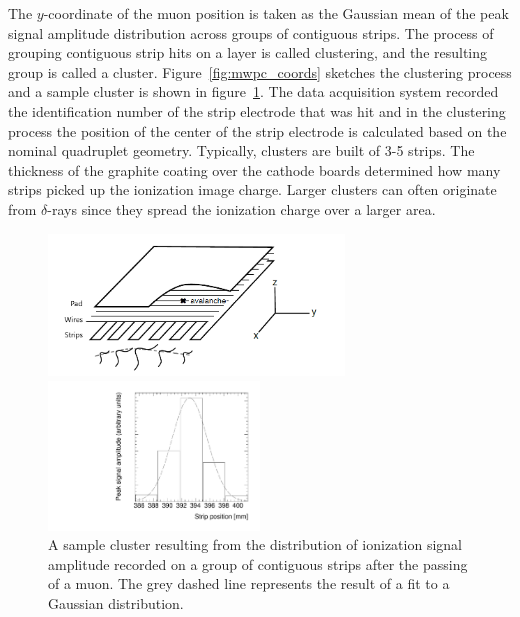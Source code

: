The $y$-coordinate of the muon position is taken as the Gaussian mean of the peak signal amplitude distribution across groups of contiguous strips. The process of grouping contiguous strip hits on a layer is called clustering, and the resulting group is called a cluster. Figure~\ref{fig:mwpc_coords} sketches the clustering process and a sample cluster is shown in figure~\ref{fig:sample_cluster}. The data acquisition system recorded the identification number of the strip electrode that was hit and in the clustering process the position of the center of the strip electrode is calculated based on the nominal quadruplet geometry. Typically, clusters are built of 3-5 strips. The thickness of the graphite coating over the cathode boards determined how many strips picked up the ionization image charge. Larger clusters can often originate from $\delta$-rays since they spread the ionization charge over a larger area.

\begin{figure}
    \centering
    \includegraphics[width = 0.7\textwidth]{figures/mwpc_lefebvre_thesis_gatti.png}
    \caption{Schematic diagram representing the three types of electrodes in a sTGC detector. The position of the ionization avalanche is extracted from the wires and strips that picked up the avalanche signal. The signals on individual strips are sketched. Clustering is the process by which a Gaussian function (represented by the grey dashed line) is fitted to the distribution of the signal amplitude on individual contiguous strips; a sample cluster is shown in figure~\ref{fig:sample_cluster}. In this work, the $x$($y$)-coordinate will always refer to the coordinate perpendicular to the wires (strips)~\cite{lefebvre_thesis, gatti_optimum_1979}.}
    \label{fig:mwpc_coords}
    \vspace*{\floatsep}
    \centering
    \includegraphics[width = 0.5\textwidth]{figures/sample_cluster_QL2C04_event5_layer2.pdf}
    \caption{A sample cluster resulting from the distribution of ionization signal amplitude recorded on a group of contiguous strips after the passing of a muon. The grey dashed line represents the result of a fit to a Gaussian distribution.}
    \label{fig:sample_cluster}
\end{figure}

